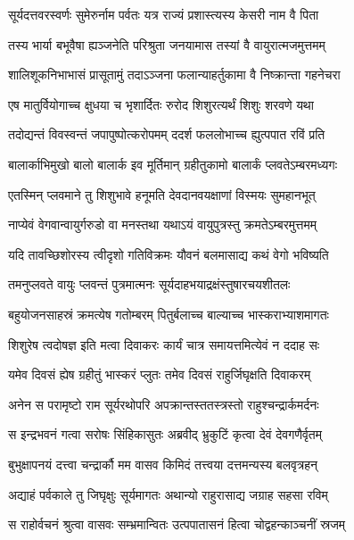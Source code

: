 \twolineshloka
{सूर्यदत्तवरस्वर्णः सुमेरुर्नाम पर्वतः}
{यत्र राज्यं प्रशास्त्यस्य केसरी नाम वै पिता} %

\twolineshloka
{तस्य भार्या बभूवैषा ह्यञ्जनेति परिश्रुता}
{जनयामास तस्यां वै वायुरात्मजमुत्तमम्} %

\twolineshloka
{शालिशूकनिभाभासं प्रासूतामुं तदाऽञ्जना}
{फलान्याहर्तुकामा वै निष्क्रान्ता गहनेचरा} %

\twolineshloka
{एष मातुर्वियोगाच्च क्षुधया च भृशार्दितः}
{रुरोद शिशुरत्यर्थं शिशुः शरवणे यथा} %

\twolineshloka
{तदोद्यन्तं विवस्वन्तं जपापुष्पोत्करोपमम्}
{ददर्श फललोभाच्च ह्युत्पपात रविं प्रति} %

\twolineshloka
{बालार्काभिमुखो बालो बालार्क इव मूर्तिमान्}
{ग्रहीतुकामो बालार्कं प्लवतेऽम्बरमध्यगः} %

\twolineshloka
{एतस्मिन् प्लवमाने तु शिशुभावे हनूमति}
{देवदानवयक्षाणां विस्मयः सुमहानभूत्} %

\twolineshloka
{नाप्येवं वेगवान्वायुर्गरुडो वा मनस्तथा}
{यथाऽयं वायुपुत्रस्तु क्रमतेऽम्बरमुत्तमम्} %

\twolineshloka
{यदि तावच्छिशोरस्य त्वीदृशो गतिविक्रमः}
{यौवनं बलमासाद्य कथं वेगो भविष्यति} %

\twolineshloka
{तमनुप्लवते वायुः प्लवन्तं पुत्रमात्मनः}
{सूर्यदाहभयाद्रक्षंस्तुषारचयशीतलः} %

\twolineshloka
{बहुयोजनसाहस्रं क्रमत्येष गतोम्बरम्}
{पितुर्बलाच्च बाल्याच्च भास्कराभ्याशमागतः} %

\twolineshloka
{शिशुरेष त्वदोषज्ञ इति मत्वा दिवाकरः}
{कार्यं चात्र समायत्तमित्येवं न ददाह सः} %

\twolineshloka
{यमेव दिवसं ह्येष ग्रहीतुं भास्करं प्लुतः}
{तमेव दिवसं राहुर्जिघृक्षति दिवाकरम्} %

\twolineshloka
{अनेन स परामृष्टो राम सूर्यरथोपरि}
{अपक्रान्तस्ततस्त्रस्तो राहुश्चन्द्रार्कमर्दनः} %

\twolineshloka
{स इन्द्रभवनं गत्वा सरोषः सिंहिकासुतः}
{अब्रवीद् भ्रुकुटिं कृत्वा देवं देवगणैर्वृतम्} %

\twolineshloka
{बुभुक्षापनयं दत्त्वा चन्द्रार्कौ मम वासव}
{किमिदं तत्त्वया दत्तमन्यस्य बलवृत्रहन्} %

\twolineshloka
{अद्याहं पर्वकाले तु जिघृक्षुः सूर्यमागतः}
{अथान्यो राहुरासाद्य जग्राह सहसा रविम्} %

\twolineshloka
{स राहोर्वचनं श्रुत्वा वासवः सम्भ्रमान्वितः}
{उत्पपातासनं हित्वा चोद्वहन्काञ्चनीं स्रजम्} %

